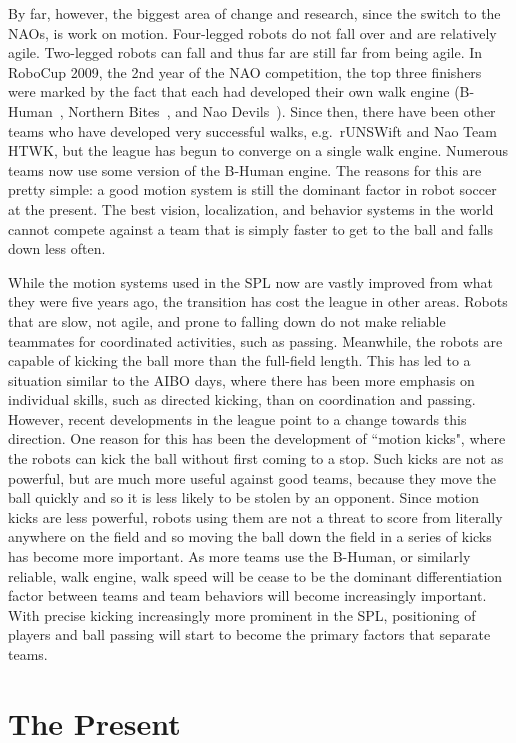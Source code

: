 \documentclass{llncs}
\begin{document}
By far, however, the biggest area of change and research, since the
switch to the NAOs, is work on motion. Four-legged robots do not fall
over and are relatively agile. Two-legged robots can fall and thus far
are still far from being agile. In RoboCup 2009, the 2nd year of the NAO competition, the top three
finishers were marked by the fact that each had developed
their own walk engine (B-Human~\cite{NaoWalking-WHSR-2009}, Northern Bites~\cite{strom-10}, and
Nao Devils~\cite{czarnetzki}). Since then, there have been other teams who have developed
very successful walks, e.g.~rUNSWift and Nao Team HTWK,
but the league has begun to converge on a single walk engine. Numerous
teams now use some version of the B-Human engine. The reasons
for this are pretty simple: a good motion system is still the dominant factor
in robot soccer at the present. The best vision, localization, and behavior
systems in the world cannot compete against a team that is simply
faster to get to the ball and falls down less often.

While the motion systems used in the SPL now are vastly improved from what they were
five years ago, the transition has cost the league in other areas. Robots that
are slow, not agile, and prone to falling down do not make reliable teammates 
for coordinated activities, such as passing. Meanwhile, the robots are
capable of kicking the ball more than the full-field length. This has led
to a situation similar to the AIBO days, where there has been more emphasis
on individual skills, such as directed kicking, than on coordination and passing.
However, recent developments in the league point to a change towards this
direction. One reason for this has been the development of ``motion
kicks", where the robots can kick the ball without first coming to a stop.
Such kicks are not as powerful, but are much more useful against good teams, because they
move the ball quickly and so it is less likely to be stolen
by an opponent. Since motion kicks are less powerful, robots using them are not
a threat to score from literally anywhere on the field and so moving the
ball down the field in a series of kicks has become more important.
As more teams use the B-Human, or similarly reliable,
walk engine, walk speed will be cease to be the dominant differentiation factor
between teams and team behaviors will become increasingly important. With
precise kicking increasingly more prominent in the SPL, positioning of players and ball passing will
start to become the primary factors that separate teams.

\section{The Present}
\end{document}
